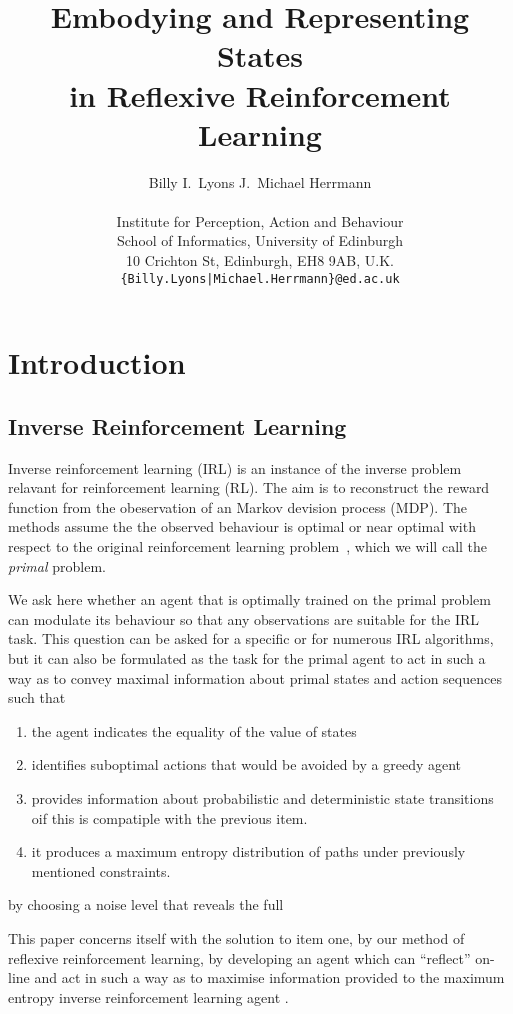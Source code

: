\documentclass{article}
\title{Embodying and Representing States\\ in Reflexive Reinforcement Learning}
\author{
  Billy I.~Lyons \quad \quad J.~Michael Herrmann \\
  \\
 {\normalsize Institute for Perception, Action and Behaviour}\\
 {\normalsize School of Informatics, University of Edinburgh}\\
 {\normalsize 10 Crichton St, Edinburgh, EH8 9AB, U.K.}\\
  \texttt{\normalsize\{Billy.Lyons|Michael.Herrmann\}@ed.ac.uk} \\
}
\date{}
\begin{document}
\maketitle

\section{Introduction}

\subsection{Inverse Reinforcement Learning}
Inverse reinforcement learning (IRL) is an instance of the inverse problem relavant for reinforcement learning (RL). The aim is to reconstruct the reward function from the obeservation of 
an Markov devision process (MDP). The methods assume the the observed behaviour 
is optimal or near optimal with respect to the original reinforcement learning 
problem~\cite{ng2000algorithms}, which we will call the \emph{primal} problem.

We ask here whether an agent that is optimally trained on the primal problem can modulate its behaviour so that any observations are suitable for the IRL task. This question can be asked for a specific or for 
numerous IRL algorithms, but it can also be formulated as the task for the primal agent to act in such a way as to convey maximal information about primal states and action sequences such that

\begin{enumerate}
\item the agent indicates the equality of the value of states
\item identifies suboptimal actions that would be avoided by a greedy agent
\item provides information about probabilistic and deterministic state transitions oif this is
compatiple with the previous item.
\item it produces a maximum entropy distribution of paths under previously mentioned constraints.
\end{enumerate}

by choosing a noise level that reveals the full 


This paper concerns itself with the solution to item one, by our method of reflexive reinforcement learning, by developing an agent which can ``reflect'' on-line and act in such a way as to maximise information provided to the maximum entropy inverse reinforcement learning agent \cite{ziebart2008maximum}.
\end{document}
